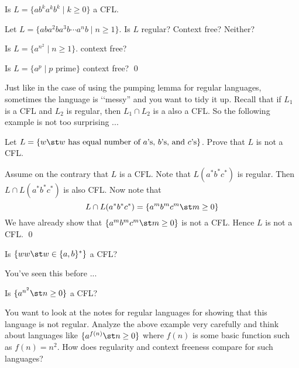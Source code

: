 \newpage
\begin{ex}
Is $L = \{ a b^{k} a^k b^{k} \mid k \geq 0 \}$ a CFL.
\end{ex}


\newpage
\begin{ex}
Let $L = \{ a b a^2 b a^3 b \cdots a^n b \mid n \geq 1 \}$.
Is $L$ regular? Context free? Neither?
\end{ex}


\newpage
\begin{ex}
Is $L = \{ a^{n^2} \mid n \geq 1 \}$.
context free?
\end{ex}

\newpage
\begin{ex}
Is $L = \{ a^p \mid p \text { prime}\}$
context free?
\qed
\end{ex}




\newpage
Just like in the case of using the pumping lemma for regular languages, 
sometimes the language is \lq\lq messy'' and you want to tidy it up.
Recall that if $L_1$ is a CFL and $L_2$ is regular,
then $L_1 \cap L_2$ is a also a CFL.
So the following example is not too surprising ...



\begin{eg}
Let $L = \{w \st w \text{ has equal number of $a$'s, $b$'s, and $c$'s} \}$.
Prove that $L$ is not a CFL.
\end{eg}

\SOLUTION
Assume on the contrary that $L$ is a CFL.
Note that $L(a^*b^*c^*)$ is regular.
Then $L \cap L(a^*b^*c^*)$ is also CFL.
Now note that
\[
L \cap L(a^*b^*c^*) 
= \{a^m b^m c^m \st m \geq 0 \}
\]
We have already show that $\{a^m b^m c^m \st m \geq 0 \}$
is not a CFL.
Hence $L$ is not a CFL.
\qed

\newpage
\begin{ex}
Is $\{ww \st w \in \{a, b\}^* \}$ a CFL?
\end{ex}




\newpage
You've seen this before ...

\begin{ex}
Is $\{a^{n^2} \st n \geq 0 \}$ a CFL?
\end{ex}

You want to look at the notes for regular languages for showing
that this language is not regular.
Analyze the above example very carefully and think about
languages like $\{a^{f(n)} \st n \geq 0 \}$ where $f(n)$ is some
basic function such as $f(n) = n^2$.
How does regularity and context freeness compare for such languages?


